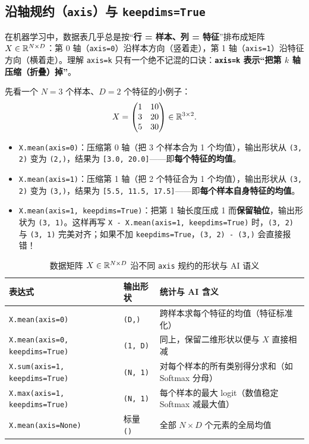 \subsection{沿轴规约（\texttt{axis}）与 \texttt{keepdims=True}}

在机器学习中，数据表几乎总是按“\textbf{行 = 样本、列 = 特征}”排布成矩阵 $X \in \mathbb{R}^{N \times D}$：第 0 轴（\texttt{axis=0}）沿样本方向（竖着走），第 1 轴（\texttt{axis=1}）沿特征方向（横着走）。理解 \texttt{axis=k} 只有一个绝不记混的口诀：\textbf{\texttt{axis=k} 表示“把第 $k$ 轴压缩（折叠）掉”}。

先看一个 $N=3$ 个样本、$D=2$ 个特征的小例子：
\[
X = \begin{pmatrix} 1 & 10 \\ 3 & 20 \\ 5 & 30 \end{pmatrix} \in \mathbb{R}^{3 \times 2}.
\]
\begin{itemize}
  \item \texttt{X.mean(axis=0)}：压缩第 0 轴（把 3 个样本合为 1 个均值），输出形状从 \texttt{(3, 2)} 变为 \texttt{(2,)}，结果为 \texttt{[3.0, 20.0]}——即\textbf{每个特征的均值}。
  \item \texttt{X.mean(axis=1)}：压缩第 1 轴（把 2 个特征合为 1 个均值），输出形状从 \texttt{(3, 2)} 变为 \texttt{(3,)}，结果为 \texttt{[5.5, 11.5, 17.5]}——即\textbf{每个样本自身特征的均值}。
  \item \texttt{X.mean(axis=1, keepdims=True)}：把第 1 轴长度压成 1 而\textbf{保留轴位}，输出形状为 \texttt{(3, 1)}。这样再写 \texttt{X - X.mean(axis=1, keepdims=True)} 时，\texttt{(3, 2)} 与 \texttt{(3, 1)} 完美对齐；如果不加 \texttt{keepdims=True}，\texttt{(3, 2) - (3,)} 会直接报错！
\end{itemize}

\begin{table}[htbp]
\centering
\caption{数据矩阵 $X \in \mathbb{R}^{N \times D}$ 沿不同 \texttt{axis} 规约的形状与 AI 语义}\label{tab:axis-summary}
{\small
\begin{tabularx}{\linewidth}{@{}p{44mm}p{24mm}X@{}}
\toprule
\textbf{表达式} & \textbf{输出形状} & \textbf{统计与 AI 含义} \\
\midrule
\texttt{X.mean(axis=0)} & \texttt{(D,)} & 跨样本求每个特征的均值（特征标准化） \\
\texttt{X.mean(axis=0, keepdims=True)} & \texttt{(1, D)} & 同上，保留二维形状以便与 $X$ 直接相减 \\
\texttt{X.sum(axis=1, keepdims=True)} & \texttt{(N, 1)} & 对每个样本的所有类别得分求和（如 Softmax 分母） \\
\texttt{X.max(axis=1, keepdims=True)} & \texttt{(N, 1)} & 每个样本的最大 logit（数值稳定 Softmax 减最大值） \\
\texttt{X.mean(axis=None)} & 标量 \texttt{()} & 全部 $N \times D$ 个元素的全局均值 \\
\bottomrule
\end{tabularx}}
\end{table}

